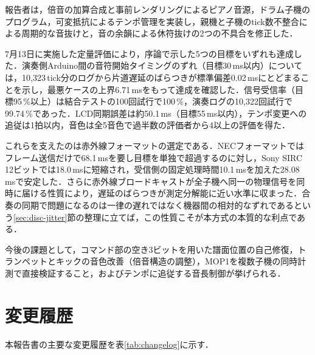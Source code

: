 \documentclass[uplatex,dvipdfmx]{jlreq}
\begin{document}
報告者は，倍音の加算合成と事前レンダリングによるピアノ音源，ドラム子機のプログラム，可変抵抗によるテンポ管理を実装し，親機と子機のtick数不整合による周期的な音抜けと，音の余韻による休符抜けの2つの不具合を修正した．

7月13日に実施した定量評価により，序論で示した5つの目標をいずれも達成した．演奏側Arduino間の音符開始タイミングのずれ（目標30\,ms以内）については，10{,}323\,tick分のログから片道遅延のばらつきが標準偏差0.02\,msにとどまることを示し，最悪ケースの上界6.71\,msをもって達成を確認した．信号受信率（目標95\,\%以上）は結合テストの100回試行で100\,\%，演奏ログの10{,}322回試行で99.74\,\%であった．LCD同期誤差は約50.1\,ms（目標55\,ms以内），テンポ変更への追従は1拍以内，音色は全5音色で過半数の評価者から4以上の評価を得た．

これらを支えたのは赤外線フォーマットの選定である．NECフォーマットではフレーム送信だけで68.1\,msを要し目標を単独で超過するのに対し，Sony SIRC 12ビットでは18.0\,msに短縮され，受信側の固定処理時間10.1\,msを加えた28.08\,msで安定した．さらに赤外線ブロードキャストが全子機へ同一の物理信号を同時に届ける性質により，遅延のばらつきが測定分解能に近い水準に収まった．合奏の同期で問題になるのは一律の遅れではなく機器間の相対的なずれであるという\ref{sec:disc-jitter}節の整理に立てば，この性質こそが本方式の本質的な利点である．

今後の課題として，コマンド部の空き3ビットを用いた譜面位置の自己修復，トランペットとキックの音色改善（倍音構造の調整），MOP1を複数子機の同時計測で直接検証すること，およびテンポに追従する音長制御が挙げられる．

\section{変更履歴}

本報告書の主要な変更履歴を表\ref{tab:changelog}に示す．
\end{document}

